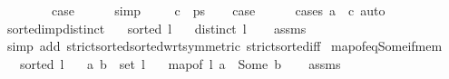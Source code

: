 \begin{isabellebody}
\ \ \isamarkupfalse%
\ {}\isanewline
\ \ \isamarkupfalse%
\ {\isacharquery}{\kern0pt}case\isanewline
\ \ \ \ \isamarkupfalse%
\ simp\isanewline
{}\isamarkupfalse%
\isanewline
\ \ \isamarkupfalse%
\ {\isacharparenleft}{\kern0pt}{}\ c\ {\isacharunderscore}{\kern0pt}\ ps{\isacharparenright}{\kern0pt}\isanewline
\ \ \isamarkupfalse%
\ {\isacharquery}{\kern0pt}case\isanewline
\ \ \ \ \isamarkupfalse%
\ {\isacharparenleft}{\kern0pt}cases\ {\isachardoublequoteopen}a\ {\isacharequal}{\kern0pt}\ c{\isachardoublequoteclose}{\isacharparenright}{\kern0pt}\ auto\isanewline
{}\isamarkupfalse%
%
\endisatagproof
{\isafoldproof}%
%
\isadelimproof
\isanewline
%
\endisadelimproof
\isanewline
\isanewline
{}\isamarkupfalse%
\ sorted{\isacharunderscore}{\kern0pt}imp{\isacharunderscore}{\kern0pt}distinct{\isacharcolon}{\kern0pt}\isanewline
\ \ \ {\isachardoublequoteopen}sorted\ l{\isachardoublequoteclose}\isanewline
\ \ \ {\isachardoublequoteopen}distinct\ l{\isachardoublequoteclose}\isanewline
%
\isadelimproof
\ \ %
\endisadelimproof
%
\isatagproof
{}\isamarkupfalse%
\ assms\isanewline
\ \ \isamarkupfalse%
\ {\isacharparenleft}{\kern0pt}simp\ add{\isacharcolon}{\kern0pt}\ strict{\isacharunderscore}{\kern0pt}sorted{\isacharunderscore}{\kern0pt}sorted{\isacharunderscore}{\kern0pt}wrt{\isacharbrackleft}{\kern0pt}symmetric{\isacharbrackright}{\kern0pt}\ strict{\isacharunderscore}{\kern0pt}sorted{\isacharunderscore}{\kern0pt}iff{\isacharparenright}{\kern0pt}%
\endisatagproof
{\isafoldproof}%
%
\isadelimproof
\isanewline
%
\endisadelimproof
\isanewline
{}\isamarkupfalse%
\ map{\isacharunderscore}{\kern0pt}of{\isacharunderscore}{\kern0pt}eq{\isacharunderscore}{\kern0pt}Some{\isacharunderscore}{\kern0pt}if{\isacharunderscore}{\kern0pt}mem{\isacharcolon}{\kern0pt}\isanewline
\ \ \ {\isachardoublequoteopen}sorted{}\ l{\isachardoublequoteclose}\isanewline
\ \ \ {\isachardoublequoteopen}{\isacharparenleft}{\kern0pt}a{\isacharcomma}{\kern0pt}\ b{\isacharparenright}{\kern0pt}\ {\isasymin}\ set\ l{\isachardoublequoteclose}\isanewline
\ \ \ {\isachardoublequoteopen}map{\isacharunderscore}{\kern0pt}of\ l\ a\ {\isacharequal}{\kern0pt}\ Some\ b{\isachardoublequoteclose}\isanewline
%
\isadelimproof
\ \ %
\endisadelimproof
%
\isatagproof
{}\isamarkupfalse%
\ assms\isanewline

\end{isabellebody}
